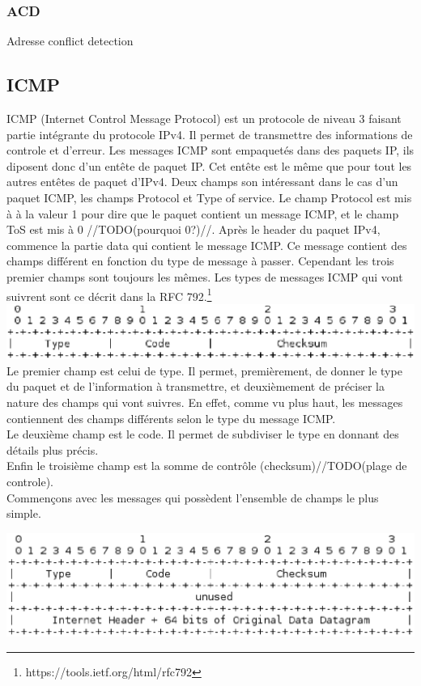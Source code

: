 \documentclass[twoside,openright,a4paper,11pt,french]{article}
\begin{document}
\subsubsection{ACD}
Adresse conflict detection
\subsection{ICMP}
ICMP (Internet Control Message Protocol) est un protocole de niveau 3 faisant partie intégrante du protocole IPv4. Il permet de transmettre des informations de controle et d'erreur. Les messages ICMP sont empaquetés dans des paquets IP, ils diposent donc d'un entête de paquet IP. Cet entête est le même que pour tout les autres entêtes de paquet d'IPv4. Deux champs son intéressant dans le cas d'un paquet ICMP, les champs Protocol et Type of service. Le champ Protocol est mis à à la valeur 1 pour dire que le paquet contient un message ICMP, et le champ ToS est mis à 0 //TODO(pourquoi 0?)//.
Après le header du paquet IPv4, commence la partie data qui contient le message ICMP. Ce message contient des champs différent en fonction du type de message à passer. Cependant les trois premier champs sont toujours les mêmes.
Les types de messages ICMP qui vont suivrent sont ce décrit dans la RFC 792.\footnote{https://tools.ietf.org/html/rfc792}
\\
\includegraphics[width=15cm]{./pics/header.eps}
\\Le premier champ est celui de type. Il permet, premièrement, de donner le type du paquet et de l'information à transmettre, et deuxièmement de préciser la nature des champs qui vont suivres. En effet, comme vu plus haut, les messages contiennent des champs différents selon le type du message ICMP.
\\Le deuxième champ est le code. Il permet de subdiviser le type en donnant des détails plus précis.
\\Enfin le troisième champ est la somme de contrôle (checksum)//TODO(plage de controle).
\\Commençons avec les messages qui possèdent l'ensemble de champs le plus simple.

\includegraphics[width=15cm]{./pics/header1.eps}
\end{document}
